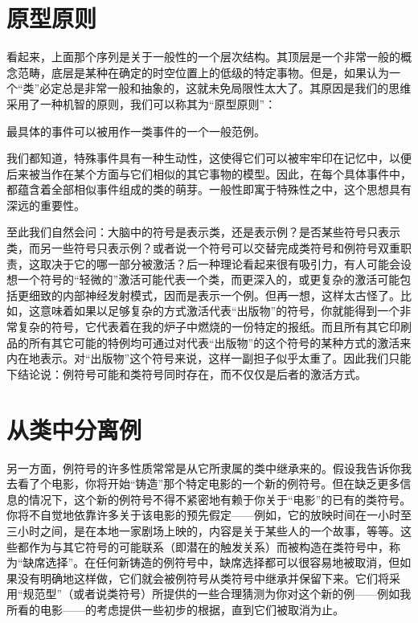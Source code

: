 \section{原型原则}

看起来，上面那个序列是关于一般性的一个层次结构。其顶层是一个非常一般的概念范畴，底层是某种在确定的时空位置上的低级的特定事物。但是，如果认为一个“类”必定总是非常一般和抽象的，这就未免局限性太大了。其原因是我们的思维采用了一种机智的原则，我们可以称其为“原型原则”：

\begin{block}
最具体的事件可以被用作一类事件的一个一般范例。
\end{block}
我们都知道，特殊事件具有一种生动性，这使得它们可以被牢牢印在记忆中，以便后来被当作在某个方面与它们相似的其它事物的模型。因此，在每个具体事件中，都蕴含着全部相似事件组成的类的萌芽。一般性即寓于特殊性之中，这个思想具有深远的重要性。

至此我们自然会问：大脑中的符号是表示类，还是表示例？是否某些符号只表示类，而另一些符号只表示例？或者说一个符号可以交替完成类符号和例符号双重职责，这取决于它的哪一部分被激活？后一种理论看起来很有吸引力，有人可能会设想一个符号的“轻微的”激活可能代表一个类，而更深入的，或更复杂的激活可能包括更细致的内部神经发射模式，因而是表示一个例。但再一想，这样太古怪了。比如，这意味着如果以足够复杂的方式激活代表“出版物”的符号，你就能得到一个非常复杂的符号，它代表着在我的炉子中燃烧的一份特定的报纸。而且所有其它印刷品的所有其它可能的特例均可通过对代表“出版物”的这个符号的某种方式的激活来内在地表示。对“出版物”这个符号来说，这样一副担子似乎太重了。因此我们只能下结论说：例符号可能和类符号同时存在，而不仅仅是后者的激活方式。

\section{从类中分离例}

另一方面，例符号的许多性质常常是从它所隶属的类中继承来的。假设我告诉你我去看了个电影，你将开始“铸造”那个特定电影的一个新的例符号。但在缺乏更多信息的情况下，这个新的例符号不得不紧密地有赖于你关于“电影”的已有的类符号。你将不自觉地依靠许多关于该电影的预先假定——例如，它的放映时间在一小时至三小时之间，是在本地一家剧场上映的，内容是关于某些人的一个故事，等等。这些都作为与其它符号的可能联系（即潜在的触发关系）而被构造在类符号中，称为“缺席选择”。在任何新铸造的例符号中，缺席选择都可以很容易地被取消，但如果没有明确地这样做，它们就会被例符号从类符号中继承并保留下来。它们将采用“规范型”（或者说类符号）所提供的一些合理猜测为你对这个新的例——例如我所看的电影——的考虑提供一些初步的根据，直到它们被取消为止。

